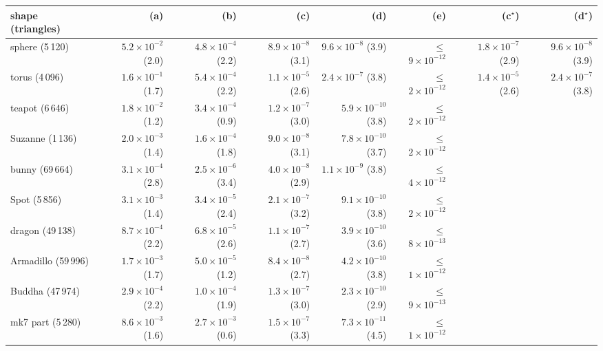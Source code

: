 \begin{tabular}{lrrrrrrr}
\toprule
shape (triangles) & (a) & (b) & (c) & (d) & (e) & (c$^\star$) & (d$^\star$) \\
\midrule
sphere (5\,120) & $5.2\times10^{-2}$ (2.0) & $4.8\times10^{-4}$ (2.2) & $8.9\times10^{-8}$ (3.1) & $9.6\times10^{-8}$ (3.9) & $\leq$$9\times10^{-12}$ & $1.8\times10^{-7}$ (2.9) & $9.6\times10^{-8}$ (3.9) \\
torus (4\,096) & $1.6\times10^{-1}$ (1.7) & $5.4\times10^{-4}$ (2.2) & $1.1\times10^{-5}$ (2.6) & $2.4\times10^{-7}$ (3.8) & $\leq$$2\times10^{-12}$ & $1.4\times10^{-5}$ (2.6) & $2.4\times10^{-7}$ (3.8) \\
teapot (6\,646) & $1.8\times10^{-2}$ (1.2) & $3.4\times10^{-4}$ (0.9) & $1.2\times10^{-7}$ (3.0) & $5.9\times10^{-10}$ (3.8) & $\leq$$2\times10^{-12}$ &  &  \\
Suzanne (1\,136) & $2.0\times10^{-3}$ (1.4) & $1.6\times10^{-4}$ (1.8) & $9.0\times10^{-8}$ (3.1) & $7.8\times10^{-10}$ (3.7) & $\leq$$2\times10^{-12}$ &  &  \\
\midrule
bunny (69\,664) & $3.1\times10^{-4}$ (2.8) & $2.5\times10^{-6}$ (3.4) & $4.0\times10^{-8}$ (2.9) & $1.1\times10^{-9}$ (3.8) & $\leq$$4\times10^{-12}$ &  &  \\
Spot (5\,856) & $3.1\times10^{-3}$ (1.4) & $3.4\times10^{-5}$ (2.4) & $2.1\times10^{-7}$ (3.2) & $9.1\times10^{-10}$ (3.8) & $\leq$$2\times10^{-12}$ &  &  \\
dragon (49\,138) & $8.7\times10^{-4}$ (2.2) & $6.8\times10^{-5}$ (2.6) & $1.1\times10^{-7}$ (2.7) & $3.9\times10^{-10}$ (3.6) & $\leq$$8\times10^{-13}$ &  &  \\
Armadillo (59\,996) & $1.7\times10^{-3}$ (1.7) & $5.0\times10^{-5}$ (1.2) & $8.4\times10^{-8}$ (2.7) & $4.2\times10^{-10}$ (3.8) & $\leq$$1\times10^{-12}$ &  &  \\
Buddha (47\,974) & $2.9\times10^{-4}$ (2.2) & $1.0\times10^{-4}$ (1.9) & $1.3\times10^{-7}$ (3.0) & $2.3\times10^{-10}$ (2.9) & $\leq$$9\times10^{-13}$ &  &  \\
mk7 part (5\,280) & $8.6\times10^{-3}$ (1.6) & $2.7\times10^{-3}$ (0.6) & $1.5\times10^{-7}$ (3.3) & $7.3\times10^{-11}$ (4.5) & $\leq$$1\times10^{-12}$ &  &  \\
\bottomrule
\end{tabular}
